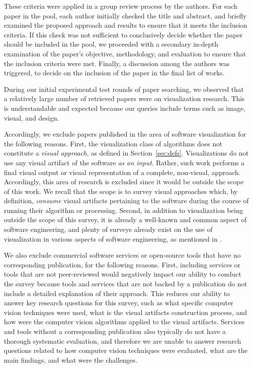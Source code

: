 These criteria were applied 
in a group review process by the authors.
For each paper in the pool, each author initially checked the title and abstract,
and briefly examined the proposed approach and results to ensure that it meets the inclusion criteria.
If this check was not sufficient to conclusively decide
whether the paper should be included in the pool,
we proceeded with a secondary in-depth examination of
the paper's objective, methodology, and evaluation to ensure that the inclusion criteria were met.
Finally, a discussion among the authors was triggered,
to decide on the inclusion of the paper in the final list of works.
 


\label{sec:exclusions}
During our initial experimental test rounds of paper searching,
we observed that a relatively large number of retrieved papers
were on visualization research.
This is understandable and expected because our queries
include terms such as image, visual, and design.

Accordingly, we exclude papers published in the area of software
visualization for the following reasons.
First, the visualization class of algorithms does not
constitute a \emph{visual approach}, as defined in Section~\ref{sec:defs}.
Visualizations do not use any visual artifact of the software \emph{as an input}.
Rather, such work performs a final visual output or visual
representation of a complete, non-visual, approach.
Accordingly, this area of research is excluded
since it would be outside the scope of this work.
We recall that the scope is to survey visual approaches which,
by definition, \emph{consume} visual artifacts pertaining to the software during the
course of running their algorithm or processing.
Second, in addition to visualization being outside the scope of this survey,
it is already a well-known and common aspect of software engineering, 
and plenty of surveys already exist on the use of visualization
in various aspects of software engineering, 
as mentioned in .

We also exclude commercial software services or open-source tools
that have no corresponding publication, for the following reasons.
First, including services or tools that are not peer-reviewed
would negatively impact our ability to conduct the survey because tools and services 
that are not backed by a publication do not include
a detailed explanation of their approach.
This reduces our ability to answer key research questions for this survey,
such as what specific computer vision techniques were used,
what is the visual artifacts construction process, and 
how were the computer vision algorithms applied to the visual artifacts.
Services and tools without a corresponding publication
also typically do not have a thorough systematic evaluation,
and therefore we are unable to answer research questions related to
how computer vision techniques were evaluated,
what are the main findings, and what were the challenges.


